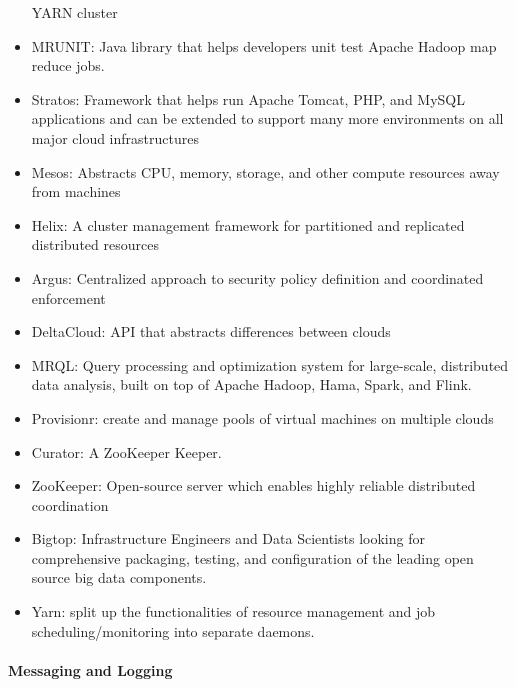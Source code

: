 \documentclass[natbib]{svjour3}
\let\oldparagraph\paragraph
\renewcommand{\paragraph}[1]{\oldparagraph{#1}\mbox{}}
\begin{document}
\begin{itemize}
  YARN cluster
\item
  MRUNIT: Java library that helps developers unit test Apache Hadoop map
  reduce jobs.
\item
  Stratos: Framework that helps run Apache Tomcat, PHP, and MySQL
  applications and can be extended to support many more environments on
  all major cloud infrastructures
\item
  Mesos: Abstracts CPU, memory, storage, and other compute resources
  away from machines
\item
  Helix: A cluster management framework for partitioned and replicated
  distributed resources
\item
  Argus: Centralized approach to security policy definition and
  coordinated enforcement
\item
  DeltaCloud: API that abstracts differences between clouds
\item
  MRQL: Query processing and optimization system for large-scale,
  distributed data analysis, built on top of Apache Hadoop, Hama, Spark,
  and Flink.
\item
  Provisionr: create and manage pools of virtual machines on multiple
  clouds
\item
  Curator: A ZooKeeper Keeper.
\item
  ZooKeeper: Open-source server which enables highly reliable
  distributed coordination
\item
  Bigtop: Infrastructure Engineers and Data Scientists looking for
  comprehensive packaging, testing, and configuration of the leading
  open source big data components.
\item
  Yarn: split up the functionalities of resource management and job
  scheduling/monitoring into separate daemons.
\end{itemize}

\paragraph{Messaging and Logging}\label{messaging-and-logging}
\end{document}
